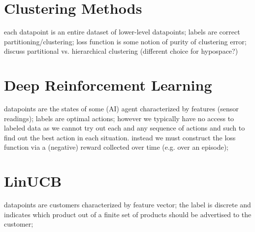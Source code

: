 \documentclass[12pt]{report}
\begin{document}
\section{Clustering Methods} 
\label{sec_clustering_methods} 
each datapoint is an entire dataset of lower-level datapoints; 
labels are correct partitioning/clustering; loss function is some 
notion of purity of clustering error; discuss partitional vs. hierarchical 
clustering (different choice for hypospace?)


\section{Deep Reinforcement Learning}
\label{sec_reinflearning_methods}
datapoints are the states of some (AI) agent characterized by features (sensor readings); 
labels are optimal actions; however we typically have no access to labeled 
data as we cannot try out each and any sequence of actions and such to 
find out the best action in each situation. instead we must construct the 
loss function via a (negative) reward collected over time (e.g. over an episode); 

\section{LinUCB}
\label{sec_lin_ucb}
datapoints are customers characterized by feature vector; the label is 
discrete and indicates which product out of a finite set of products should 
be advertised to the customer; 
\end{document}
